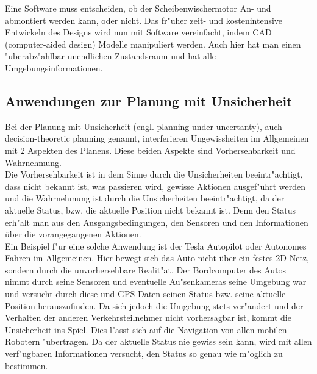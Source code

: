 Eine Software muss entscheiden, ob der Scheibenwischermotor An- und abmontiert werden kann, oder nicht. Das fr"uher zeit- und kostenintensive Entwickeln des Designs wird nun mit Software vereinfacht, indem CAD (computer-aided design) Modelle manipuliert werden. Auch hier hat man einen "uberabz"ahlbar unendlichen Zustandsraum und hat alle Umgebungsinformationen.
\subsection{Anwendungen zur Planung mit Unsicherheit}
Bei der Planung mit Unsicherheit (engl. planning under uncertanty), auch decision-theoretic planning genannt, interferieren Ungewissheiten im Allgemeinen mit 2 Aspekten des Planens. Diese beiden Aspekte sind Vorhersehbarkeit und Wahrnehmung.\\
Die Vorhersehbarkeit ist in dem Sinne durch die Unsicherheiten beeintr"achtigt, dass nicht bekannt ist, was passieren wird, gewisse Aktionen ausgef"uhrt werden und die Wahrnehmung ist durch die Unsicherheiten beeintr"achtigt, da der aktuelle Status, bzw. die aktuelle Position nicht bekannt ist. Denn den Status erh"alt man aus den Ausgangsbedingungen, den Sensoren und den Informationen über die vorangegangenen Aktionen.\\
Ein Beispiel f"ur eine solche Anwendung ist der Tesla Autopilot oder Autonomes Fahren im Allgemeinen. Hier bewegt sich das Auto nicht über ein festes 2D Netz, sondern durch die unvorhersehbare Realit"at. Der Bordcomputer des Autos nimmt durch seine Sensoren und eventuelle Au"senkameras seine Umgebung war und versucht durch diese und GPS-Daten seinen Status bzw. seine aktuelle Position herauszufinden. Da sich jedoch die Umgebung stets ver"andert und der Verhalten der anderen Verkehrsteilnehmer nicht vorhersagbar ist, kommt die Unsicherheit ins Spiel.
Dies l"asst sich auf die Navigation von allen mobilen Robotern "ubertragen.
Da der aktuelle Status nie gewiss sein kann, wird mit allen verf"ugbaren Informationen versucht, den Status so genau wie m"oglich zu bestimmen.
